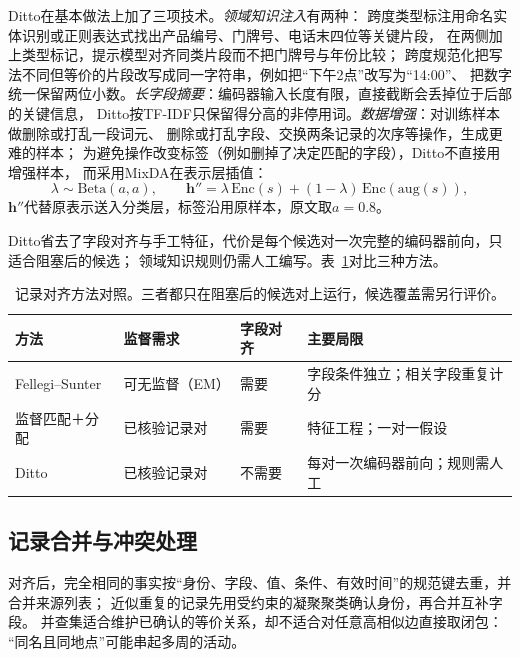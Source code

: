 Ditto在基本做法上加了三项技术。\emph{领域知识注入}有两种：
跨度类型标注用命名实体识别或正则表达式找出产品编号、门牌号、电话末四位等关键片段，
在两侧加上类型标记，提示模型对齐同类片段而不把门牌号与年份比较；
跨度规范化把写法不同但等价的片段改写成同一字符串，例如把“下午2点”改写为“14:00”、
把数字统一保留两位小数。\emph{长字段摘要}：编码器输入长度有限，直接截断会丢掉位于后部的关键信息，
Ditto按TF-IDF只保留得分高的非停用词。\emph{数据增强}：对训练样本做删除或打乱一段词元、
删除或打乱字段、交换两条记录的次序等操作，生成更难的样本；
为避免操作改变标签（例如删掉了决定匹配的字段），Ditto不直接用增强样本，
而采用MixDA在表示层插值：
\begin{equation}
  \lambda\sim\mathrm{Beta}(a,a),\qquad
  \bm{h}''=\lambda\,\mathrm{Enc}(s)+(1-\lambda)\,\mathrm{Enc}(\mathrm{aug}(s)),
  \label{eq:nlp-extraction-mixda}
\end{equation}
$\bm{h}''$代替原表示送入分类层，标签沿用原样本，原文取$a=0.8$。

Ditto省去了字段对齐与手工特征，代价是每个候选对一次完整的编码器前向，只适合阻塞后的候选；
领域知识规则仍需人工编写。表~\ref{tab:nlp-extraction-alignment-methods}对比三种方法。

\begin{table}[htbp]
  \centering
  \small
  \begin{tabularx}{\linewidth}{@{}>{\raggedright\arraybackslash}p{16mm} XXX@{}}
    \toprule
    方法 & 监督需求 & 字段对齐 & 主要局限\\
    \midrule
    Fellegi--Sunter & 可无监督（EM） & 需要 & 字段条件独立；相关字段重复计分 \\
    监督匹配＋分配 & 已核验记录对 & 需要 & 特征工程；一对一假设 \\
    Ditto & 已核验记录对 & 不需要 & 每对一次编码器前向；规则需人工 \\
    \bottomrule
  \end{tabularx}
  \caption{记录对齐方法对照。三者都只在阻塞后的候选对上运行，候选覆盖需另行评价。}
  \label{tab:nlp-extraction-alignment-methods}
\end{table}

\subsection{记录合并与冲突处理}
\label{sec:nlp-extraction-merge}

对齐后，完全相同的事实按“身份、字段、值、条件、有效时间”的规范键去重，并合并来源列表；
近似重复的记录先用受约束的凝聚聚类确认身份，再合并互补字段。
并查集适合维护已确认的等价关系，却不适合对任意高相似边直接取闭包：
“同名且同地点”可能串起多周的活动。

